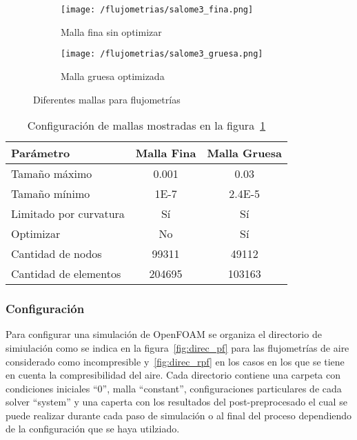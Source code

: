 \begin{figure}[t!]
    \centering
    \begin{subfigure}[t]{0.5\textwidth}
        \centering
        \texttt{[image: /flujometrias/salome3\_fina.png]}
        \caption{Malla fina sin optimizar}
    \end{subfigure}%
    \begin{subfigure}[t]{0.5\textwidth}
        \centering
        \texttt{[image: /flujometrias/salome3\_gruesa.png]}
        \caption{Malla gruesa optimizada}
    \end{subfigure}
    \caption{Diferentes mallas para flujometrías}\label{fig:salome_fina_gruesa}
\end{figure}

\begin{table}
    \centering
    \begin{tabular}{lcc} \toprule
        Parámetro                & Malla Fina    & Malla Gruesa \\ \midrule
        Tamaño máximo            & 0.001         & 0.03 \\
        Tamaño mínimo            & 1E-7          & 2.4E-5 \\
        Limitado por curvatura   & Sí            & Sí \\
        Optimizar                & No            & Sí \\
        Cantidad de nodos        & 99311         & 49112 \\
        Cantidad de elementos    & 204695        & 103163 \\ \bottomrule
    \end{tabular}
    \caption{Configuración de mallas mostradas en la figura~\ref{fig:salome_fina_gruesa}}
    \label{tab:salome_fina_gruesa}
\end{table}





\subsubsection{Configuración}
%
Para configurar una simulación de OpenFOAM se organiza el directorio de
simiulación como se indica en la figura~\ref{fig:direc_pf} para las flujometrías
de aire considerado como incompresible  y~\ref{fig:direc_rpf} en los casos en
los que se tiene en cuenta la compresibilidad del aire.
%
Cada directorio contiene una carpeta con condiciones iniciales ``0'', malla
``constant'', configuraciones particulares de cada solver ``system'' y una
caperta con los resultados del post-preprocesado el cual se puede realizar
durante cada paso de simulación o al final del proceso dependiendo de la
configuración que se haya utilziado.

